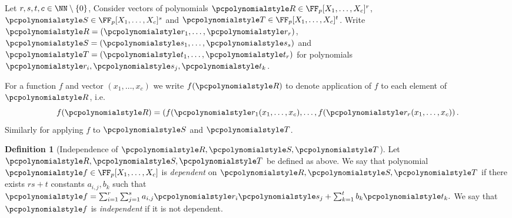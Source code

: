 \documentclass[runningheads,11pt]{llncs}
\theoremstyle{definition} \newtheorem{definition}[theorem]{Definition}
\begin{document}
Let $r, s, t, c \in \NN \setminus \smallset{0}$, Consider vectors of polynomials
$\pR \in \FF_p[X_1, \ldots, X_c]^r$, $\pS \in \FF_p[X_1, \ldots, X_c]^s$ and
$\pT \in \FF_p[X_1, \ldots, X_c]^t$. Write $\pR = \left( \p{r}_1, \ldots,
  \p{r}_r \right)$, $\pS = \left( \p{s}_1, \ldots, \p{s}_s \right)$ and $\pT =
\left( \p{t}_1, \ldots, \p{t}_r \right)$ for polynomials $\p{r}_i, \p{s}_j,
\p{t}_k$.

For a function $f$ and vector $(x_1, \ldots, x_c)$ we write $f(\pR)$ to
denote application of $f$ to each element of $\pR$, i.e.
\[
	f(\pR) = \left( f(\p{r}_1 (x_1, \ldots, x_c), \ldots, f(\p{r}_r
	(x_1, \ldots, x_c) \right).
\]
Similarly for applying $f$ to $\pS$ and $\pT$.

\begin{definition}[Independence of $\pR, \pS, \pT$]
	\label{def:independence}
	Let $\pR, \pS, \pT$ be defined as above. We say that polynomial $\p{f} \in
  \FF_p[X_1, \ldots, X_c]$ is \emph{dependent} on $\pR, \pS, \pT$ if there
  exists $rs + t$ constants $a_{i, j}, b_k$ such that $ \p{f} = \sum_{i = 1}^{r}
  \sum_{j = 1}^{s} a_{i, j} \p{r}_i \p{s}_j + \sum_{k = 1}^{t} b_k \p{t}_k. $ We
  say that $\p{f}$ is \emph{independent} if it is not dependent.
\end{definition}
\end{document}
